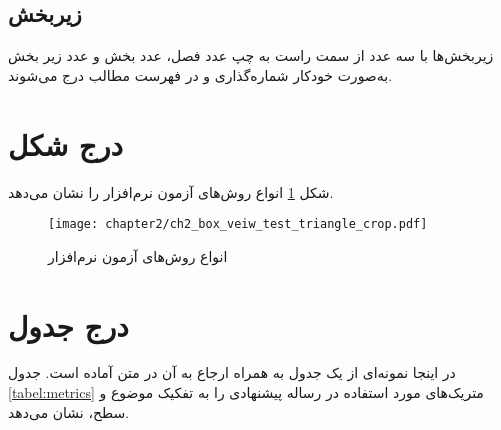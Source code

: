 \subsection{زیربخش}
زیربخش‌ها با سه عدد از سمت راست به چپ عدد فصل، عدد بخش و عدد زیر بخش به‌صورت خودکار شماره‌گذاری و در فهرست مطالب درج می‌شوند.

\section{درج شکل}
   شکل 
     \ref{fig:ch2_box_veiw_test_triangle_crop}
     انواع روش‌های  آزمون نرم‌افزار را نشان می‌دهد.
  
  
\begin{figure}[!h]
    \centering
    \texttt{[image: chapter2/ch2\_box\_veiw\_test\_triangle\_crop.pdf]}
    \caption[ انواع روش‌های آزمون نرم‌افزار]
    {
        انواع روش‌های آزمون نرم‌افزار
    }
    \label{fig:ch2_box_veiw_test_triangle_crop}
\end{figure}

\section{درج جدول}
در اینجا نمونه‌ای از یک جدول به همراه ارجاع به آن در متن آماده است.
جدول
\ref{tabel:metrics}
متریک‌های مورد استفاده در رساله پیشنهادی را به تفکیک موضوع و سطح، نشان می‌دهد.  


